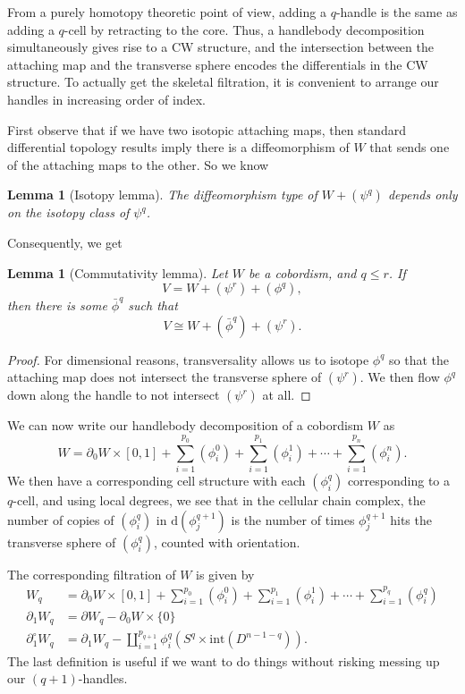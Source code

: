 \documentclass[a4paper, 12pt]{article}
\newtheorem{lemma}[thm]{Lemma}
\theoremstyle{definition}
\newcommand\fakeqed{\pushQED{\qed}\qedhere}
\begin{document}
From a purely homotopy theoretic point of view, adding a $q$-handle is the same as adding a $q$-cell by retracting to the core. Thus, a handlebody decomposition simultaneously gives rise to a CW structure, and the intersection between the attaching map and the transverse sphere encodes the differentials in the CW structure. To actually get the skeletal filtration, it is convenient to arrange our handles in increasing order of index.

First observe that if we have two isotopic attaching maps, then standard differential topology results imply there is a diffeomorphism of $W$ that sends one of the attaching maps to the other. So we know
\begin{lemma}[Isotopy lemma]
  The diffeomorphism type of $W + (\psi^q)$ depends only on the isotopy class of $\psi^q$.\fakeqed
\end{lemma}

Consequently, we get
\begin{lemma}[Commutativity lemma]
  Let $W$ be a cobordism, and $q \leq r$. If
  \[
    V = W + (\psi^r) + (\phi^q),
  \]
  then there is some $\bar{\phi}^q$ such that
  \[
    V \cong W + (\bar{\phi}^q) + (\psi^r).
  \]
\end{lemma}

\begin{proof}
  For dimensional reasons, transversality allows us to isotope $\phi^q$ so that the attaching map does not intersect the transverse sphere of $(\psi^r)$. We then flow $\phi^q$ down along the handle to not intersect $(\psi^r)$ at all.
\end{proof}

We can now write our handlebody decomposition of a cobordism $W$ as
\[
  W = \partial_0 W \times [0, 1] + \sum_{i = 1}^{p_0} (\phi_i^0) + \sum_{i = 1}^{p_1} (\phi_i^1) + \cdots + \sum_{i = 1}^{p_n} (\phi_i^n).
\]
We then have a corresponding cell structure with each $(\phi_i^q)$ corresponding to a $q$-cell, and using local degrees, we see that in the cellular chain complex, the number of copies of $(\phi_i^q)$ in $\mathrm{d} (\phi_j^{q + 1})$ is the number of times $\phi_j^{q + 1}$ hits the transverse sphere of $(\phi_i^q)$, counted with orientation.

The corresponding filtration of $W$ is given by
\begin{align*}
  W_q &= \partial_0 W \times [0, 1] + \sum_{i = 1}^{p_0} (\phi_i^0) + \sum_{i = 1}^{p_1} (\phi_i^1) + \cdots + \sum_{i = 1}^{p_q} (\phi_i^q)\\
  \partial_1 W_q &= \partial W_q - \partial_0 W \times \{0\}\\
  \partial_1^\circ W_q &= \partial_1 W_q - \coprod_{i = 1}^{p_{q + 1}} \phi_i^q(S^q \times \mathrm{int}(D^{n - 1 - q})).
\end{align*}
The last definition is useful if we want to do things without risking messing up our $(q + 1)$-handles.
\end{document}

